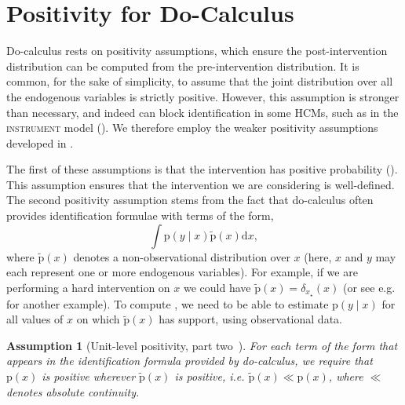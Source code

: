 \documentclass[12pt]{article}
\newtheorem{assumption}{Assumption}
\newcommand{\di}{\mathrm{d}}
\newcommand{\pr}{\mathrm{p}}
\begin{document}
\section{Positivity for Do-Calculus} \label{apx:positivity}

Do-calculus rests on positivity assumptions, which ensure the post-intervention distribution can be computed from the pre-intervention distribution. 
It is common, for the sake of simplicity, to assume that the joint distribution over all the endogenous variables is strictly positive. 
However, this assumption is stronger than necessary, and indeed can block identification in some HCMs, such as in the \textsc{instrument} model ().
We therefore employ the weaker positivity assumptions developed in \citet{Shpitser2006-jg}.

The first of these assumptions is that the intervention has positive probability ().
This assumption ensures that the intervention we are considering is well-defined.
The second positivity assumption stems from the fact that do-calculus often provides identification formulae with terms of the form, 
\begin{equation} \label{eqn:positive_term}
	\int \pr(y \mid x) \tilde{\pr}(x) \di x,
\end{equation}
where $\tilde{\pr}(x)$ denotes a non-observational distribution over $x$ (here, $x$ and $y$ may each represent one or more endogenous variables).
For example, if we are performing a hard intervention on $x$ we could have $\tilde{\pr}(x) = \delta_{x_\star}(x)$ (or see e.g.  for another example).
To compute , we need to be able to estimate $\pr(y \mid x)$ for all values of $x$ on which $\tilde{\pr}(x)$ has support, using observational data.
\begin{assumption}[Unit-level positivity, part two~\citep{Shpitser2006-jg}] \label{asm:positivity_2}
	For each term of the form  that appears in the identification formula provided by do-calculus, we require that $\pr(x)$ is positive wherever $\tilde{\pr}(x)$ is positive, i.e. $\tilde{\pr}(x) \ll \pr(x)$, where $\ll$ denotes absolute continuity.
\end{assumption}
\end{document}
